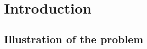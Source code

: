 \documentclass[MS,synopsis]{iitmdiss}
\title{\mythesistitle}
\author{\myname}
\date{\MakeUppercase
  {\mysubmissionmonth}}
\begin{document}
\maketitle


\setcounter{page}{0}


\section{Introduction}
\label{sec:intro}


\subsection{Illustration of the problem}
\label{sec:problem}







\def \LLL {{\em ``$\mathbb{B}$rief Interviews with Hideous Men''}}
\def \GGG {{\em ``The String $\mathbb{T}$heory''}} 
\def \BBB {{\em ``[$\mathbb{W}$]Rhetoric and the Math Melodrama''}}
\def \TTT {{\em ``$\mathbb{F}$ate, Time, and Language: An Essay on Free Will''}}
\end{document}

